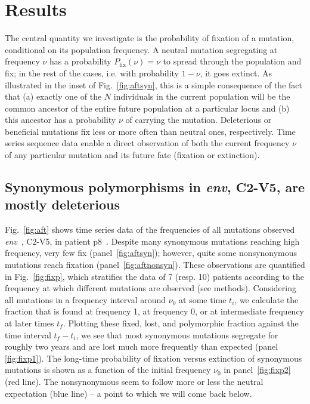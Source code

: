 \documentclass[rmp, twocolumn]{revtex4}
\newcommand{\FIG}[1]{Fig.~\ref{fig:#1}}
\newcommand{\env}{\textit{env}}
\begin{document}
\section{Results}

The central quantity we investigate is the probability of fixation of a
mutation, conditional on its population frequency.  A neutral mutation
segregating at frequency $\nu$ has a probability $P_\text{fix}(\nu) = \nu$ to
spread through the population and fix; in the rest of the cases, i.e. with
probability $1-\nu$, it goes extinct. As illustrated in the inset of \FIG{aftsyn},
this is a simple consequence of the fact that
(a) exactly one of the $N$ individuals in the current population will be
the common ancestor of the entire future population at a particular locus and
(b) this ancestor has a probability $\nu$ of carrying the mutation.
Deleterious or beneficial mutations fix less or
more often than neutral ones, respectively. Time series sequence data enable a
direct observation of both the current frequency $\nu$ of any particular
mutation and its future fate (fixation or extinction). 


\subsection{Synonymous polymorphisms in \env, C2-V5, are mostly deleterious}

\FIG{aft} shows time series data of the frequencies of all mutations observed
\env~, C2-V5, in patient p8~\citep{shankarappa_consistent_1999}. Despite many
synonymous mutations reaching high frequency, very few fix
(panel~\ref{fig:aftsyn}); however, quite some nonsynonymous mutations reach
fixation (panel~\ref{fig:aftnonsyn}).
These observations are quantified in \FIG{fixp}, which stratifies the data
of 7 (resp. 10) patients according to the frequency at which
different mutations are observed (see methods). Considering all mutations in a
frequency interval around $\nu_0$ at some time $t_i$, we calculate the fraction
that is found at frequency 1, at frequency 0, or at intermediate frequency at
later times $t_f$. Plotting these fixed, lost, and polymorphic fraction against
the time interval $t_f-t_i$, we see that most synonymous mutations segregate for
roughly two years and are lost much more frequently than expected (panel
\ref{fig:fixp1}). The long-time probability of fixation versus extinction of
synonymous mutations is shown as a function of the initial frequency $\nu_0$
in panel~\ref{fig:fixp2} (red line). The nonsynonymous seem to follow more or
less the neutral expectation (blue line) -- a point to which we will come back
below. 
\end{document}
